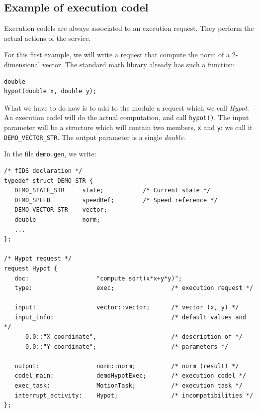 \subsection{Example of execution codel}

Execution  codels are always associated  to   an execution request.  They
perform the actual actions of the service.

For this first example, we will write a request  that compute the norm of
a 2-dimensional vector. The standard math library already has such a
function:

\begin{center}\begin{cartouche}\small\begin{verbatim}
double
hypot(double x, double y);
\end{verbatim}\end{cartouche}\end{center}

What we have to do now  is to add  to the module  a request which we call
{\em Hypot}. An execution codel will do  the actual computation, and call
{\tt hypot()}. The input parameter will be a structure which will contain
two members, {\tt x} and {\tt y}: we call it {\tt DEMO\_VECTOR\_STR}. The
output parameter is a single {\em double}.

In the file {\tt demo.gen}, we write:

\begin{center}\begin{cartouche}\small\begin{verbatim}
/* fIDS declaration */
typedef struct DEMO_STR {
   DEMO_STATE_STR     state;           /* Current state */
   DEMO_SPEED         speedRef;        /* Speed reference */
   DEMO_VECTOR_STR    vector;
   double             norm;
   ...
};

/* Hypot request */
request Hypot {
   doc:                   "compute sqrt(x*x+y*y)";
   type:                  exec;                /* execution request */

   input:                 vector::vector;      /* vector (x, y) */
   input_info:                                 /* default values and */
      0.0::"X coordinate",                     /* description of */
      0.0::"Y coordinate";                     /* parameters */
   
   output:                norm::norm;          /* norm (result) */
   codel_main:            demoHypotExec;       /* execution codel */
   exec_task:             MotionTask;          /* execution task */
   interrupt_activity:    Hypot;               /* incompatibilities */
};
\end{verbatim}\end{cartouche}\end{center}

